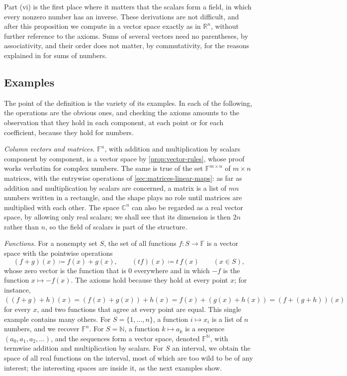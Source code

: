 Part (vi) is the first place where it matters that the scalars form a field, in which every nonzero number has an inverse. These derivations are not difficult, and after this proposition we compute in a vector space exactly as in $\mathbb R^n$, without further reference to the axioms. Sums of several vectors need no parentheses, by associativity, and their order does not matter, by commutativity, for the reasons explained in  for sums of numbers.

\subsection{Examples}

The point of the definition is the variety of its examples. In each of the following, the operations are the obvious ones, and checking the axioms amounts to the observation that they hold in each component, at each point or for each coefficient, because they hold for numbers.

\emph{Column vectors and matrices.} $\mathbb F^n$, with addition and multiplication by scalars component by component, is a vector space by \cref{prop:vector-rules}, whose proof works verbatim for complex numbers. The same is true of the set $\mathbb F^{m\times n}$ of $m\times n$ matrices, with the entrywise operations of \cref{sec:matrices-linear-maps}: as far as addition and multiplication by scalars are concerned, a matrix is a list of $mn$ numbers written in a rectangle, and the shape plays no role until matrices are multiplied with each other. The space $\mathbb C^n$ can also be regarded as a real vector space, by allowing only real scalars; we shall see that its dimension is then $2n$ rather than $n$, so the field of scalars is part of the structure.

\emph{Functions.} For a nonempty set $S$, the set of all functions $f\colon S\to\mathbb F$ is a vector space with the pointwise operations
\[
(f+g)(x)\coloneqq f(x)+g(x),\qquad(tf)(x)\coloneqq t\,f(x)\qquad(x\in S),
\]
whose zero vector is the function that is $0$ everywhere and in which $-f$ is the function $x\mapsto-f(x)$. The axioms hold because they hold at every point $x$; for instance, $((f+g)+h)(x)=(f(x)+g(x))+h(x)=f(x)+(g(x)+h(x))=(f+(g+h))(x)$ for every $x$, and two functions that agree at every point are equal. This single example contains many others. For $S=\{1,\ldots,n\}$, a function $i\mapsto x_i$ is a list of $n$ numbers, and we recover $\mathbb F^n$. For $S=\mathbb N$, a function $k\mapsto a_k$ is a sequence $(a_0,a_1,a_2,\ldots)$, and the sequences form a vector space, denoted $\mathbb F^{\mathbb N}$, with termwise addition and multiplication by scalars. For $S$ an interval, we obtain the space of all real functions on the interval, most of which are too wild to be of any interest; the interesting spaces are inside it, as the next examples show.

